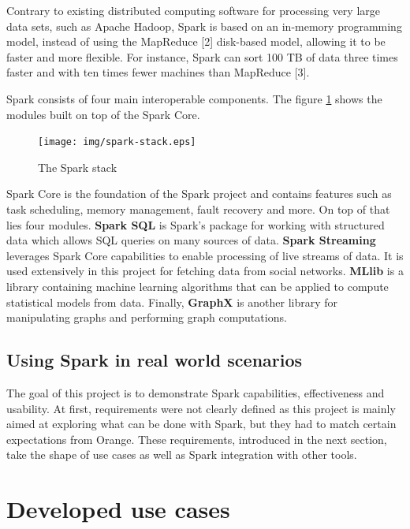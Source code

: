 \documentclass[11pt]{article}
\begin{document}
Contrary to existing distributed computing software for processing very large data sets, such as \textsf{Apache Hadoop}, \textsf{Spark} is based on an in-memory programming model, instead of using the \textsf{MapReduce} [2] disk-based model, allowing it to be faster and more flexible. For instance, \textsf{Spark} can sort 100 TB of data three times faster and with ten times fewer machines than \textsf{MapReduce} [3].
\vspace{9pt}

\textsf{Spark} consists of four main interoperable components. The figure \ref{spark-stack} shows the modules built on top of the \textsf{Spark Core}.

\newpage
\begin{figure}[h!]
    \centering
    \texttt{[image: img/spark-stack.eps]}
    \caption{The Spark stack}
    \label{spark-stack}
\end{figure}

\textsf{Spark Core} is the foundation of the \textsf{Spark} project and contains features such as task scheduling, memory management, fault recovery and more. On top of that lies four modules.
\textsf{\textbf{Spark SQL}} is \textsf{Spark}'s package for working with structured data which allows \textsf{SQL} queries on many sources of data.
\textsf{\textbf{Spark Streaming}} leverages \textsf{Spark Core} capabilities to enable processing of live streams of data. It is used extensively in this project for fetching data from social networks.
\textsf{\textbf{MLlib}} is a library containing machine learning algorithms that can be applied to compute statistical models from data.
Finally, \textsf{\textbf{GraphX}} is another library for manipulating graphs and performing graph computations. 

\subsection{Using Spark in real world scenarios}
The goal of this project is to demonstrate \textsf{Spark} capabilities, effectiveness and usability. At first, requirements were not clearly defined as this project is mainly aimed at exploring what can be done with \textsf{Spark}, but they had to match certain expectations from \textsf{Orange}. These requirements, introduced in the next section, take the shape of use cases as well as \textsf{Spark} integration with other tools.

\section{Developed use cases}
\end{document}
